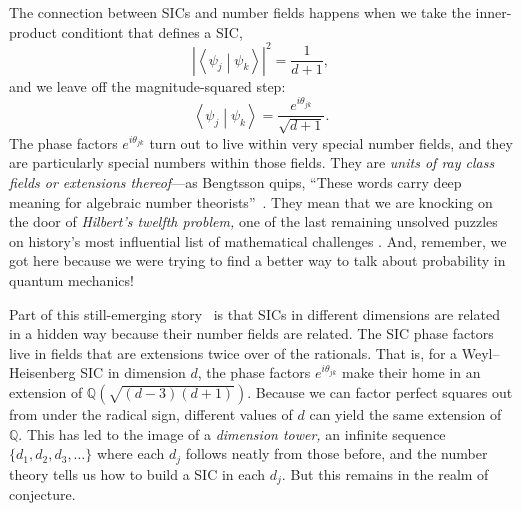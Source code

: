 \documentclass[aps,pra,superscriptaddress,12pt,tightenlines,nofootinbib]{revtex4-2}
\newcommand{\braket}[2]{{\ensuremath{\left\langle #1 \middle| #2
      \right\rangle}}}
\begin{document}
The connection between SICs and number fields happens when we take the
inner-product conditiont that defines a SIC,
\begin{equation}
\left|\braket{\psi_j}{\psi_k}\right|^2 = \frac{1}{d+1},
\end{equation}
and we leave off the magnitude-squared step:
\begin{equation}
\braket{\psi_j}{\psi_k} = \frac{e^{i\theta_{jk}}}{\sqrt{d+1}}.
\end{equation}
The phase factors $e^{i\theta_{jk}}$ turn out to live within very special
number fields, and they are particularly special numbers within those
fields.  They are {\it units of ray class fields or extensions
  thereof}---as Bengtsson quips, ``These words carry deep meaning for
algebraic number theorists''~\cite{Bengtsson16}.  They mean that we
are knocking on the door of {\it Hilbert's twelfth problem,} one of
the last remaining unsolved puzzles on history's most influential list
of mathematical challenges \cite{Schappacher98}.  And, remember, we got here because we
were trying to find a better way to talk about probability in quantum
mechanics!

Part of this still-emerging story~\cite{RCF-SIC} is that SICs in
different dimensions are related in a hidden way because their number
fields are related.  The SIC phase factors live in fields that are
extensions twice over of the rationals.  That is, for a
Weyl--Heisenberg SIC in dimension $d$, the phase factors
$e^{i\theta_{jk}}$ make their home in an extension of
$\mathbb{Q}\left(\sqrt{(d-3)(d+1)}\right)$.  Because we can factor perfect
squares out from under the radical sign, different values of $d$ can yield
the same extension of $\mathbb{Q}$.  This has led to the image of a {\it dimension
  tower,} an infinite sequence $\{d_1, d_2, d_3, \ldots\}$ where each
$d_j$ follows neatly from those before, and the number theory tells us
how to build a SIC in each $d_j$.  But this remains in the realm of
conjecture.
\end{document}

